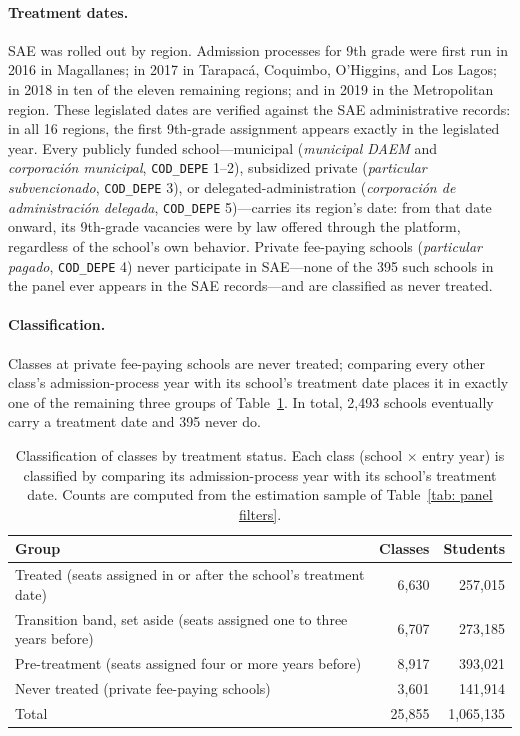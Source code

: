 \paragraph{Treatment dates.}
SAE was rolled out by region. Admission processes for 9th grade were first run in 2016 in Magallanes; in 2017 in Tarapacá, Coquimbo, O'Higgins, and Los Lagos; in 2018 in ten of the eleven remaining regions; and in 2019 in the Metropolitan region. These legislated dates are verified against the SAE administrative records: in all 16 regions, the first 9th-grade assignment appears exactly in the legislated year. Every publicly funded school---municipal (\textit{municipal DAEM} and \textit{corporaci\'on municipal}, \texttt{COD\_DEPE} 1--2), subsidized private (\textit{particular subvencionado}, \texttt{COD\_DEPE} 3), or delegated-administration (\textit{corporaci\'on de administraci\'on delegada}, \texttt{COD\_DEPE} 5)---carries its region's date: from that date onward, its 9th-grade vacancies were by law offered through the platform, regardless of the school's own behavior. Private fee-paying schools (\textit{particular pagado}, \texttt{COD\_DEPE} 4) never participate in SAE---none of the 395 such schools in the panel ever appears in the SAE records---and are classified as never treated.

\paragraph{Classification.}
Classes at private fee-paying schools are never treated; comparing every other class's admission-process year with its school's treatment date places it in exactly one of the remaining three groups of Table~\ref{tab: panel classification}. In total, 2,493 schools eventually carry a treatment date and 395 never do.

\begin{table}[ht]
    \centering
    \caption{Classification of classes by treatment status. Each class (school $\times$ entry year) is classified by comparing its admission-process year with its school's treatment date. Counts are computed from the estimation sample of Table~\ref{tab: panel filters}.}
    \label{tab: panel classification}
    \small
    \begin{tabular}{p{9.8cm}rr}
    \toprule
    Group & Classes & Students \\
    \midrule
    Treated (seats assigned in or after the school's treatment date) & 6,630 & 257,015 \\
    Transition band, set aside (seats assigned one to three years before) & 6,707 & 273,185 \\
    Pre-treatment (seats assigned four or more years before) & 8,917 & 393,021 \\
    Never treated (private fee-paying schools) & 3,601 & 141,914 \\
    \midrule
    Total & 25,855 & 1,065,135 \\
    \bottomrule
    \end{tabular}
\end{table}

